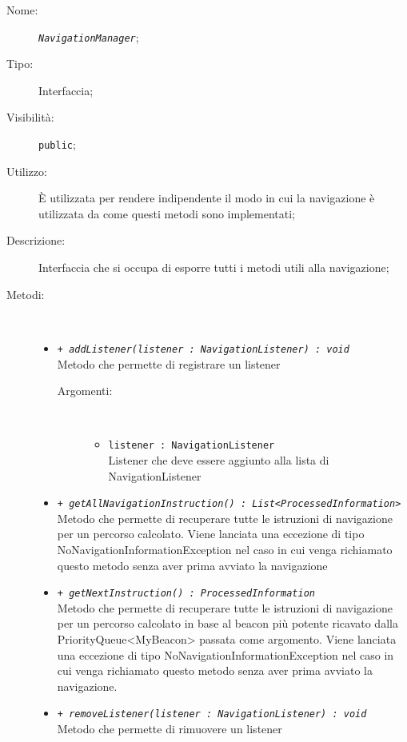 \documentclass[../DefinizioneDiProdotto.tex]{subfiles}
\begin{document}
\begin{description}
	\item[Nome:] \texttt{\textit{NavigationManager}};
	\item[Tipo:] Interfaccia;
	\item[Visibilità:] \texttt{public};
	\item[Utilizzo:] È utilizzata per rendere indipendente il modo in cui la navigazione è utilizzata da come questi metodi sono implementati;
	\item[Descrizione:] Interfaccia che si occupa di esporre tutti i metodi utili alla navigazione;
	\item[Metodi:] \
	\begin{itemize}
		\item \texttt{+ \textit{addListener(listener : NavigationListener) : void}}\\
		Metodo che permette di registrare un listener
		\begin{description}
			\item[Argomenti:] \
			\begin{itemize}
				\item \texttt{listener : NavigationListener}\\
				Listener che deve essere aggiunto alla lista di NavigationListener\end{itemize}
		\end{description}
		\item \texttt{+ \textit{getAllNavigationInstruction() : List<ProcessedInformation>}}\\
		Metodo che permette di recuperare tutte le istruzioni di navigazione per un percorso calcolato. Viene lanciata una eccezione di tipo NoNavigationInformationException nel caso in cui venga richiamato questo metodo senza aver prima avviato la navigazione
		\item \texttt{+ \textit{getNextInstruction() : ProcessedInformation}}\\
		Metodo che permette di recuperare tutte le istruzioni di navigazione per un percorso calcolato in base al beacon più potente ricavato dalla PriorityQueue<MyBeacon> passata come argomento. Viene lanciata una eccezione di tipo NoNavigationInformationException nel caso in cui venga richiamato questo metodo senza aver prima avviato la navigazione.
		\item \texttt{+ \textit{removeListener(listener : NavigationListener) : void}}\\
		Metodo che permette di rimuovere un listener
		\begin{description}

\end{description}
\end{itemize}
\end{description}
\end{document}

